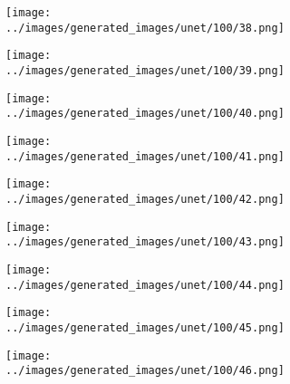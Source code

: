 \begin{figure}[H]
\hspace{1em}%
\begin{subfigure}[b]{0.1\textwidth}
\centering
\texttt{[image: ../images/generated\_images/unet/100/38.png]}
\end{subfigure}
\hspace{1em}%
\begin{subfigure}[b]{0.1\textwidth}
\centering
\texttt{[image: ../images/generated\_images/unet/100/39.png]}
\end{subfigure}
\hspace{1em}%
\begin{subfigure}[b]{0.1\textwidth}
\centering
\texttt{[image: ../images/generated\_images/unet/100/40.png]}
\end{subfigure}
\hspace{1em}%
\begin{subfigure}[b]{0.1\textwidth}
\centering
\texttt{[image: ../images/generated\_images/unet/100/41.png]}
\end{subfigure}
\hspace{1em}%
\begin{subfigure}[b]{0.1\textwidth}
\centering
\texttt{[image: ../images/generated\_images/unet/100/42.png]}
\end{subfigure}
\hspace{1em}%
\begin{subfigure}[b]{0.1\textwidth}
\centering
\texttt{[image: ../images/generated\_images/unet/100/43.png]}
\end{subfigure}
\hspace{1em}%
\begin{subfigure}[b]{0.1\textwidth}
\centering
\texttt{[image: ../images/generated\_images/unet/100/44.png]}
\end{subfigure}
\hspace{1em}%
\begin{subfigure}[b]{0.1\textwidth}
\centering
\texttt{[image: ../images/generated\_images/unet/100/45.png]}
\end{subfigure}
\hspace{1em}%
\begin{subfigure}[b]{0.1\textwidth}
\centering
\texttt{[image: ../images/generated\_images/unet/100/46.png]}
\end{subfigure}
\hspace{1em}%
\begin{subfigure}[b]{0.1\textwidth}

\end{subfigure}
\end{figure}
